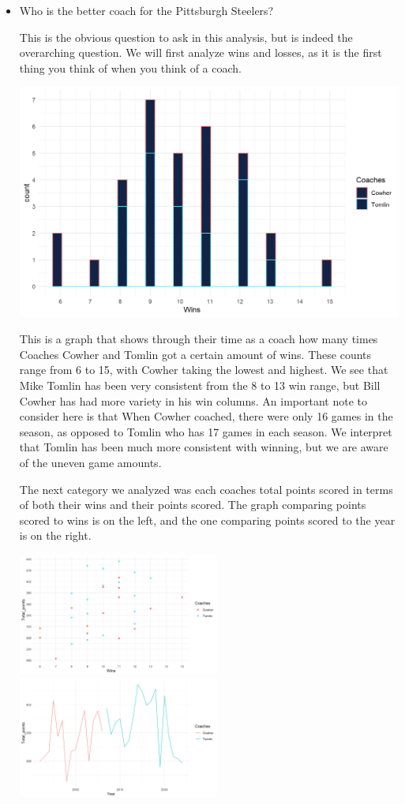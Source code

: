 \documentclass[
  letterpaper,
  DIV=11,
  numbers=noendperiod]{scrartcl}
\begin{document}
\begin{itemize}
\item
  Who is the better coach for the Pittsburgh Steelers?

  This is the obvious question to ask in this analysis, but is indeed
  the overarching question. We will first analyze wins and losses, as it
  is the first thing you think of when you think of a coach.

  \includegraphics{images/clipboard-4000230535.png}

  This is a graph that shows through their time as a coach how many
  times Coaches Cowher and Tomlin got a certain amount of wins. These
  counts range from 6 to 15, with Cowher taking the lowest and highest.
  We see that Mike Tomlin has been very consistent from the 8 to 13 win
  range, but Bill Cowher has had more variety in his win columns. An
  important note to consider here is that When Cowher coached, there
  were only 16 games in the season, as opposed to Tomlin who has 17
  games in each season. We interpret that Tomlin has been much more
  consistent with winning, but we are aware of the uneven game amounts.

  The next category we analyzed was each coaches total points scored in
  terms of both their wins and their points scored. The graph comparing
  points scored to wins is on the left, and the one comparing points
  scored to the year is on the right.

  \includegraphics[width=2.60417in,height=\textheight]{images/clipboard-3424389474.png}\includegraphics[width=2.60417in,height=\textheight]{images/clipboard-64297739.png}


\end{itemize}
\end{document}
